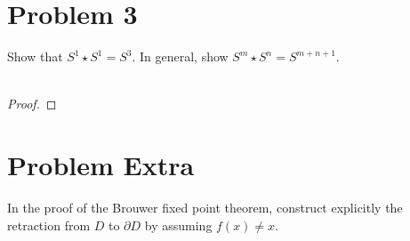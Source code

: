\documentclass[fontsize=11pt]{scrartcl} %
\numberwithin{equation}{section} %
\numberwithin{figure}{section} %
\numberwithin{table}{section} %
\begin{document}
\section*{Problem 3}
Show that $S^1\star S^1=S^3$. In general, show $S^m\star S^n= S^{m+n+1}$.
\\
\\
\begin{proof}
    
\end{proof}



\section*{Problem Extra}
In the proof of the Brouwer fixed point theorem, construct explicitly the
retraction from $D$ to $\partial D$ by assuming $f(x)\neq x$.
\end{document}
